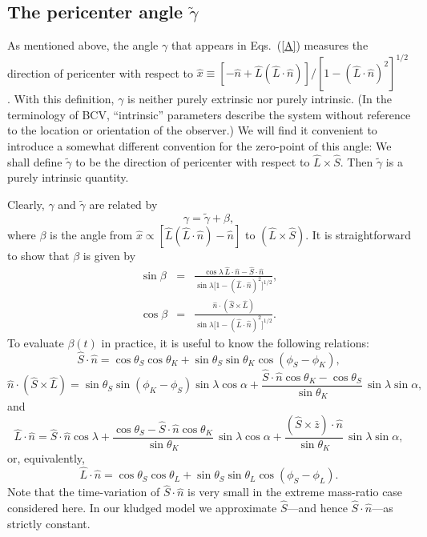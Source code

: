 \documentclass[11pt]{report}
\def\be{\begin{equation}}
\def\ee{\end{equation}}
\begin{document}
\subsection{The pericenter angle $\tilde \gamma$ }

As mentioned above, the angle $\gamma$ that appears in Eqs.\ (\ref{A})
measures the
direction of pericenter with respect to
$\hat x \equiv [-\hat n + \hat L (\hat L\cdot \hat n)]/
[1-(\hat L\cdot \hat n)^2]^{1/2}$. With this definition,
$\gamma$ is neither purely extrinsic nor purely intrinsic.
(In the terminology of BCV, ``intrinsic'' parameters describe the
system without reference to the location or orientation of the observer.)
We will find it convenient to introduce a
somewhat different convention for the
zero-point of this angle: We shall define $\tilde\gamma$ to be
the direction of pericenter
with respect to $\hat L \times \hat S$. Then $\tilde\gamma$
is a purely intrinsic quantity.

Clearly, $\gamma$  and $\tilde \gamma$ are related by
\be\label{beta}
\gamma = \tilde\gamma + \beta,
\ee
where $\beta$ is the angle from $\hat x \propto [\hat L(\hat L \cdot \hat n)
- \hat n] $ to $(\hat L \times \hat S)$.
It is straightforward to show that $\beta$ is given by
\begin{eqnarray}\label{sinbeta}
\sin\beta &=& \frac{\cos\lambda\, \hat L\cdot\hat n -\hat S\cdot \hat n }
{\sin\lambda\bigl[1 - (\hat L\cdot\hat n)^2\bigr]^{1/2}}, \nonumber \\
\cos\beta &=& \frac{\hat n \cdot (\hat S \times \hat L)}
{\sin\lambda\bigl[1 - (\hat L\cdot\hat n)^2\bigr]^{1/2} }.
\end{eqnarray}
To evaluate $\beta(t)$ in practice, it is useful to know the following
relations:
\be\label{SdotN}
{ \hat S}\cdot{ \hat n} = \cos\theta_S \cos\theta_K
+ \sin\theta_S \sin\theta_K \cos(\phi_S-\phi_K),
\ee
\be\label{ScrossLdotN}
\hat n \cdot (\hat S \times \hat L) =
\sin\theta_S \sin(\phi_K-\phi_S)\sin\lambda \cos\alpha
+ \frac{\hat S\cdot\hat n \cos\theta_K -\cos\theta_S}{\sin\theta_K}
\, \sin\lambda \sin\alpha,
\ee
and
\be\label{LdotN}
{ \hat L}\cdot{ \hat n} = { \hat S}\cdot{ \hat n}\cos\lambda
+ \frac{\cos\theta_S - \hat S\cdot\hat n \cos\theta_K}{\sin\theta_K}
\, \sin\lambda \cos\alpha + \frac{(\hat S \times \bar z)\cdot \hat n}
{\sin\theta_K}  \, \sin\lambda \sin\alpha,
\ee
or, equivalently,
\be\label{2LdotN}
{ \hat L}\cdot{ \hat n} = \cos\theta_S \cos\theta_L +
\sin\theta_S \sin\theta_L \cos(\phi_S-\phi_L).
\ee
Note that the time-variation of ${ \hat S}\cdot{ \hat n}$ is very small
in the extreme mass-ratio case considered here.
In our kludged model we approximate $\hat S$---and hence ${\hat S}\cdot{\hat n}$---as strictly constant.
\end{document}
